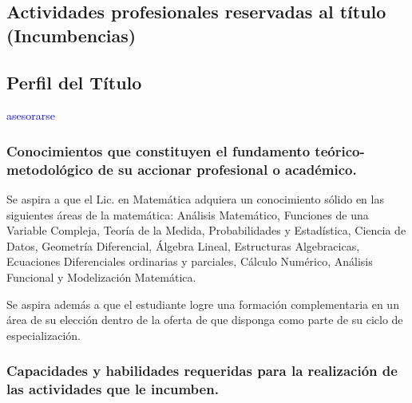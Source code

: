 \documentclass[a4paper, 12pt]{article}
\begin{document}
\subsection{Actividades profesionales reservadas al título (Incumbencias)}
    
\subsection{Perfil del Título}
\textcolor{blue}{asesorarse}


\subsubsection{Conocimientos que constituyen el fundamento teórico-metodológico de su accionar profesional o académico.}

Se aspira a que el Lic. en Matemática adquiera un conocimiento sólido en las siguientes  áreas de
 la matemática: Análisis Matemático, Funciones de una Variable Compleja,   Teoría de la Medida, Probabilidades y Estadística, Ciencia de Datos, Geometría Diferencial, Álgebra Lineal, Estructuras Algebracicas, Ecuaciones Diferenciales ordinarias y parciales, Cálculo Numérico, Análisis Funcional y Modelización Matemática.

 Se aspira además a que el estudiante logre una formación complementaria en un área de su elección dentro de la oferta de que disponga como parte de su ciclo de especialización.
 
\subsubsection{Capacidades y habilidades requeridas para la realización de las actividades que le incumben.}
\end{document}
